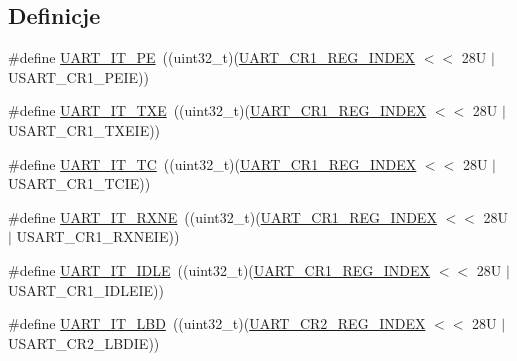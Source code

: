 \subsection*{Definicje}
\begin{DoxyCompactItemize}
\item 
\#define \hyperlink{group___u_a_r_t___interrupt__definition_ga55f922ddcf513509710ade5d7c40a1db}{U\+A\+R\+T\+\_\+\+I\+T\+\_\+\+PE}~((uint32\+\_\+t)(\hyperlink{group___u_a_r_t___private___constants_ga5917bcb19b2dab202b8cbfa82520b93e}{U\+A\+R\+T\+\_\+\+C\+R1\+\_\+\+R\+E\+G\+\_\+\+I\+N\+D\+EX} $<$$<$ 28\+U $\vert$ U\+S\+A\+R\+T\+\_\+\+C\+R1\+\_\+\+P\+E\+I\+E))
\item 
\#define \hyperlink{group___u_a_r_t___interrupt__definition_ga552636e2af516d578856f5ee2ba71ed7}{U\+A\+R\+T\+\_\+\+I\+T\+\_\+\+T\+XE}~((uint32\+\_\+t)(\hyperlink{group___u_a_r_t___private___constants_ga5917bcb19b2dab202b8cbfa82520b93e}{U\+A\+R\+T\+\_\+\+C\+R1\+\_\+\+R\+E\+G\+\_\+\+I\+N\+D\+EX} $<$$<$ 28\+U $\vert$ U\+S\+A\+R\+T\+\_\+\+C\+R1\+\_\+\+T\+X\+E\+I\+E))
\item 
\#define \hyperlink{group___u_a_r_t___interrupt__definition_gab9a4dc4e8cea354fd60f4117513b2004}{U\+A\+R\+T\+\_\+\+I\+T\+\_\+\+TC}~((uint32\+\_\+t)(\hyperlink{group___u_a_r_t___private___constants_ga5917bcb19b2dab202b8cbfa82520b93e}{U\+A\+R\+T\+\_\+\+C\+R1\+\_\+\+R\+E\+G\+\_\+\+I\+N\+D\+EX} $<$$<$ 28\+U $\vert$ U\+S\+A\+R\+T\+\_\+\+C\+R1\+\_\+\+T\+C\+I\+E))
\item 
\#define \hyperlink{group___u_a_r_t___interrupt__definition_gac1bedf7a65eb8c3f3c4b52bdb24b139d}{U\+A\+R\+T\+\_\+\+I\+T\+\_\+\+R\+X\+NE}~((uint32\+\_\+t)(\hyperlink{group___u_a_r_t___private___constants_ga5917bcb19b2dab202b8cbfa82520b93e}{U\+A\+R\+T\+\_\+\+C\+R1\+\_\+\+R\+E\+G\+\_\+\+I\+N\+D\+EX} $<$$<$ 28\+U $\vert$ U\+S\+A\+R\+T\+\_\+\+C\+R1\+\_\+\+R\+X\+N\+E\+I\+E))
\item 
\#define \hyperlink{group___u_a_r_t___interrupt__definition_ga9781808d4f9999061fc2da36572191d9}{U\+A\+R\+T\+\_\+\+I\+T\+\_\+\+I\+D\+LE}~((uint32\+\_\+t)(\hyperlink{group___u_a_r_t___private___constants_ga5917bcb19b2dab202b8cbfa82520b93e}{U\+A\+R\+T\+\_\+\+C\+R1\+\_\+\+R\+E\+G\+\_\+\+I\+N\+D\+EX} $<$$<$ 28\+U $\vert$ U\+S\+A\+R\+T\+\_\+\+C\+R1\+\_\+\+I\+D\+L\+E\+I\+E))
\item 
\#define \hyperlink{group___u_a_r_t___interrupt__definition_gabca5e77508dc2dd9aa26fcb683d9b988}{U\+A\+R\+T\+\_\+\+I\+T\+\_\+\+L\+BD}~((uint32\+\_\+t)(\hyperlink{group___u_a_r_t___private___constants_ga3a8b0ee44c75493eb001e60a9876e586}{U\+A\+R\+T\+\_\+\+C\+R2\+\_\+\+R\+E\+G\+\_\+\+I\+N\+D\+EX} $<$$<$ 28\+U $\vert$ U\+S\+A\+R\+T\+\_\+\+C\+R2\+\_\+\+L\+B\+D\+I\+E))

\end{DoxyCompactItemize}
